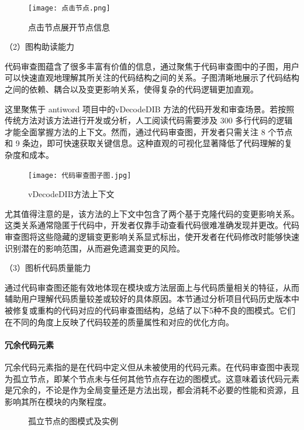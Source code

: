 \begin{figure}[h]
\centering
\texttt{[image: 点击节点.png]}
\caption{点击节点展开节点信息}
\end{figure}


\noindent（2）图构助读能力

代码审查图蕴含了很多丰富有价值的信息，通过聚焦于代码审查图中的子图，用户可以快速直观地理解其所关注的代码结构之间的关系。子图清晰地展示了代码结构之间的依赖、耦合以及变更影响关系，使得复杂的代码逻辑更加直观。

这里聚焦于 antiword 项目中的vDecodeDIB 方法的代码开发和审查场景。若按照传统方法对该方法进行开发或分析，人工阅读代码需要涉及 300 多行代码的逻辑才能全面掌握方法的上下文。然而，通过代码审查图，开发者只需关注 8 个节点和 9 条边，即可快速获取关键信息。这种直观的可视化显著降低了代码理解的复杂度和成本。

\begin{figure}[h]
\centering
\texttt{[image: 代码审查图子图.jpg]}
\caption{vDecodeDIB方法上下文}
\end{figure}

尤其值得注意的是，该方法的上下文中包含了两个基于克隆代码的变更影响关系。这类关系通常隐匿于代码中，开发者仅靠手动查看代码很难准确发现并更改。代码审查图将这些隐藏的逻辑变更影响关系显式标出，使开发者在代码修改时能够快速识别潜在的影响范围，从而避免遗漏变更的风险。

\noindent（3）图析代码质量能力

通过代码审查图还能有效地体现在模块或方法层面上与代码质量相关的特征，从而辅助用户理解代码质量较差或较好的具体原因。本节通过分析项目代码历史版本中被修复或重构的代码对应的代码审查图结构，总结了以下5种不良的图模式。它们在不同的角度上反映了代码较差的质量属性和对应的优化方向。

\paragraph{冗余代码元素} 冗余代码元素指的是在代码中定义但从未被使用的代码元素。在代码审查图中表现为孤立节点，即某个节点未与任何其他节点存在边的图模式。这意味着该代码元素是冗余的，不论是作为全局变量还是方法出现，都会消耗不必要的性能和资源，且影响其所在模块的内聚程度。

\begin{figure}[!h]
    \setlength{\subfigcapskip}{-1bp}
    \centering
    \begin{minipage}{\textwidth}
    \centering
    \hspace{2em}
    \end{minipage}
    \vspace{0.2em}
    \caption{孤立节点的图模式及实例} %
\end{figure}


